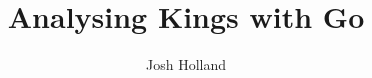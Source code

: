 \documentclass{beamer}
\title{Analysing Kings with Go}
\author{Josh Holland}
\begin{document}
\frame{\titlepage}
\end{document}
